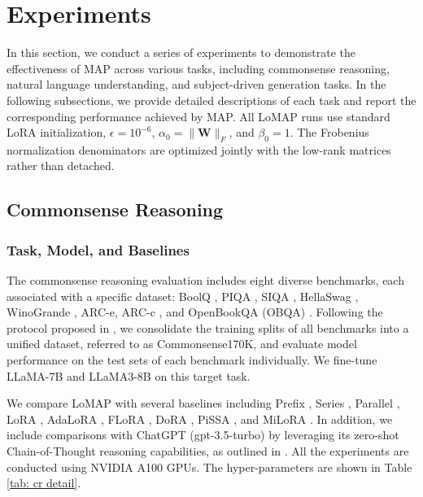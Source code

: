 \section{Experiments}

In this section, we conduct a series of experiments to demonstrate the effectiveness of MAP across various tasks, including commonsense reasoning, natural language understanding, and subject-driven generation tasks.
In the following subsections, we provide detailed descriptions of each task and report the corresponding performance achieved by MAP.
All LoMAP runs use standard LoRA initialization, $\epsilon=10^{-6}$, $\alpha_0=\|\mathbf{W}\|_F$, and $\beta_0=1$.
The Frobenius normalization denominators are optimized jointly with the low-rank matrices rather than detached.






\subsection{Commonsense Reasoning}

\subsubsection{Task, Model, and Baselines}

The commonsense reasoning evaluation includes eight diverse benchmarks, each associated with a specific dataset: BoolQ \cite{clark2019boolq}, PIQA \cite{bisk2020piqa}, SIQA \cite{sap2019socialiqa}, HellaSwag \cite{zellers2019hellaswag}, WinoGrande \cite{sakaguchi2021winogrande}, ARC-e, ARC-c \cite{clark2018thinkarce}, and OpenBookQA (OBQA) \cite{mihaylov2018canobqa}. 
Following the protocol proposed in \cite{hu2023llm}, we consolidate the training splits of all benchmarks into a unified dataset, referred to as Commonsense170K, and evaluate model performance on the test sets of each benchmark individually.
We fine-tune LLaMA-7B \cite{touvron2023llama} and LLaMA3-8B \cite{llama3modelcard} on this target task. 

We compare LoMAP with several baselines including Prefix \cite{li2021prefix}, Series \cite{houlsby2019parameter}, Parallel \cite{he2021towards}, LoRA \cite{hu2021lora}, AdaLoRA \cite{zhang2022adaptive}, FLoRA \cite{si2024flora}, DoRA \cite{liu2024dora}, PiSSA \cite{meng2024pissa}, and MiLoRA \cite{wang2024milora}.
In addition, we include comparisons with ChatGPT (gpt-3.5-turbo) by leveraging its zero-shot Chain-of-Thought reasoning capabilities, as outlined in \cite{wei2022chain}.
All the experiments are conducted using NVIDIA A100 GPUs. 
The hyper-parameters are
shown in Table \ref{tab: cr detail}.



